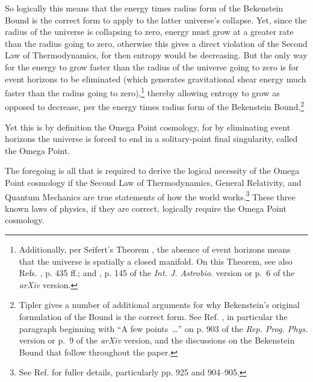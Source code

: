 \documentclass[letterpaper,12pt]{article}
\begin{document}
So logically this means that the energy times radius form of the Bekenstein Bound is the correct form to apply to the latter universe's collapse. Yet, since the radius of the universe is collapsing to zero, energy must grow at a greater rate than the radius going to zero, otherwise this gives a direct violation of the Second Law of Thermodynamics, for then entropy would be decreasing. But the only way for the energy to grow faster than the radius of the universe going to zero is for event horizons to be eliminated (which generates gravitational shear energy much faster than the radius going to zero),\footnote{Additionally, per Seifert's Theorem \cite{Seifert1971}, the absence of event horizons means that the universe is spatially a closed manifold. On this Theorem, see also Refs. , p. 435 ff.; and , p. 145 of the \emph{Int. J. Astrobio.} version or p.~6 of the \emph{arXiv} version.} thereby allowing entropy to grow as opposed to decrease, per the energy times radius form of the Bekenstein Bound.\footnote{Tipler gives a number of additional arguments for why Bekenstein's original formulation of the Bound is the correct form. See Ref. , in particular the paragraph beginning with ``A few points~\ldots'' on p. 903 of the \emph{Rep. Prog. Phys.} version or p.~9 of the \emph{arXiv} version, and the discussions on the Bekenstein Bound that follow throughout the paper.}

Yet this is by definition the Omega Point cosmology, for by eliminating event horizons the universe is forced to end in a solitary-point final singularity, called the Omega Point.

The foregoing is all that is required to derive the logical necessity of the Omega Point cosmology if the Second Law of Thermodynamics, General Relativity, and Quantum Mechanics are true statements of how the world works.\footnote{See Ref.  for fuller details, particularly pp. 925 and 904--905.} These three known laws of physics, if they are correct, logically require the Omega Point cosmology.
\end{document}
